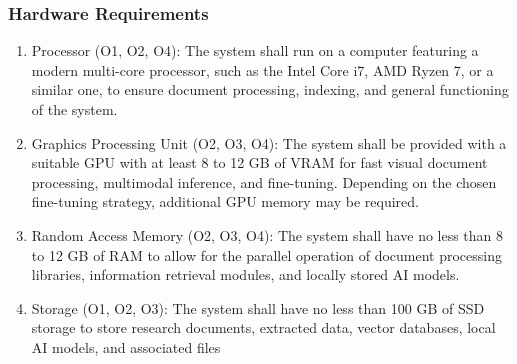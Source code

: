 \documentclass[11pt,a4paper]{report}
\begin{document}
\subsubsection{Hardware Requirements}
\begin{enumerate}
  \item Processor (O1, O2, O4): The system shall run on a computer featuring a modern multi-core processor, such as the Intel Core i7, AMD Ryzen 7, or a similar one, to ensure document processing, indexing, and general functioning of the system.
  \item Graphics Processing Unit (O2, O3, O4): The system shall be provided with a suitable \ac{GPU} with at least 8 to 12 GB of VRAM for fast visual document processing, multimodal inference, and fine-tuning. Depending on the chosen fine-tuning strategy, additional \ac{GPU} memory may be required.
  \item Random Access Memory (O2, O3, O4): The system shall have no less than 8 to 12 GB of RAM to allow for the parallel operation of document processing libraries, information retrieval modules, and locally stored \ac{AI} models.
  \item Storage (O1, O2, O3): The system shall have no less than 100 GB of SSD storage to store research documents, extracted data, vector databases, local \ac{AI} models, and associated files
\end{enumerate}
\end{document}
